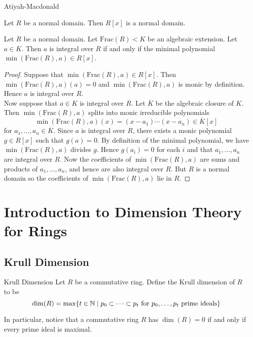 \documentclass[a4paper]{article}
\begin{document}
Atiyah-Macdonald

\begin{prp}{}{} Let $R$ be a normal domain. Then $R[x]$ is a normal domain. 
\end{prp}

\begin{prp}{}{} Let $R$ be a normal domain. Let $\text{Frac}(R)<K$ be an algebraic extension. Let $a\in K$. Then $a$ is integral over $R$ if and only if the minimal polynomial $\min(\text{Frac}(R),a)\in R[x]$. 
\begin{proof}
Suppose that $\min(\text{Frac}(R),a)\in R[x]$. Then $\min(\text{Frac}(R),a)(a)=0$ and $\min(\text{Frac}(R),a)$ is monic by definition. Hence $a$ is integral over $R$. \\

Now suppose that $a\in K$ is integral over $R$. Let $\overline{K}$ be the algebraic closure of $K$. Then $\min(\text{Frac}(R),a)$ splits into monic irreducible polynomials $$\min(\text{Frac}(R),a)(x)=(x-a_1)\cdots(x-a_n)\in\overline{K}[x]$$ for $a_1,\dots,a_n\in\overline{K}$. Since $a$ is integral over $R$, there exists a monic polynomial $g\in R[x]$ such that $g(a)=0$. By definition of the minimal polynomial, we have $\min(\text{Frac}(R),a)$ divides $g$. Hence $g(a_i)=0$ for each $i$ and that $a_1,\dots,a_n$ are integral over $R$. Now the coefficients of $\min(\text{Frac}(R),a)$ are sums and products of $a_1,\dots,a_n$, and hence are also integral over $R$. But $R$ is a normal domain so the coefficients of $\min(\text{Frac}(R),a)$ lie in $R$. 
\end{proof}
\end{prp}

\pagebreak
\section{Introduction to Dimension Theory for Rings}
\subsection{Krull Dimension}
\begin{defn}{Krull Dimension}{} Let $R$ be a commutative ring. Define the Krull dimension of $R$ to be $$\dim(R)=\max\{t\in\mathbb{N}\;|\;p_0\subset\dots\subset p_t\text{ for }p_0,\dots,p_t\text{ prime ideals}\}$$
\end{defn}

In particular, notice that a commutative ring $R$ has $\dim(R)=0$ if and only if every prime ideal is maximal. 
\end{document}
